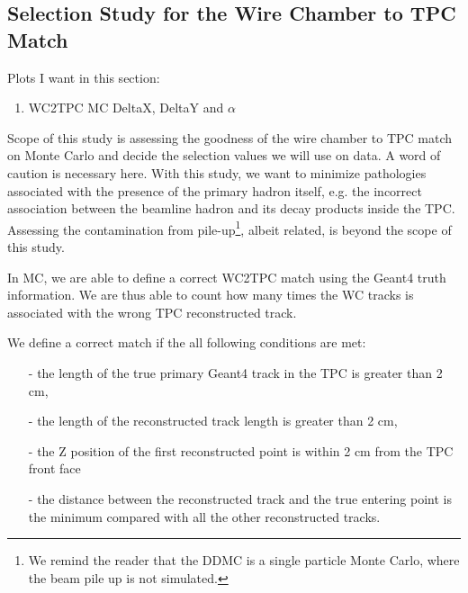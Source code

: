 

\subsection{Selection Study for the Wire Chamber to TPC Match}\label{ch:WC2TPCMatchOptimization}
Plots I want in this section:
\begin{enumerate}
\item WC2TPC MC DeltaX, DeltaY and $\alpha$
\end{enumerate}


Scope of this study is assessing the goodness of the wire chamber to TPC match on Monte Carlo and decide the selection values we will use on data. A word of caution is necessary here. With this study, we want to minimize pathologies associated with the presence of the primary hadron itself, e.g. the incorrect association between the beamline hadron and its decay products inside the TPC.  Assessing the contamination from pile-up\footnote{We remind the reader that the DDMC is a single particle Monte Carlo, where the beam pile up is not simulated.}, albeit related, is beyond the scope of this study.

In MC, we are able to define a correct WC2TPC match using the Geant4 truth information. We are thus able to count how many times the WC tracks is associated with the wrong TPC reconstructed track. 

We define a correct match if the all following conditions are met:
\begin{itemize}
\item[-] the length of the true primary Geant4 track in the TPC is greater than 2 cm,  
\item[-] the length of the reconstructed track length is greater than 2 cm,
\item[-] the Z position of the first reconstructed point is within 2 cm from the TPC front face
\item[-] the distance between the reconstructed track and the true entering point is the minimum compared with all the other reconstructed tracks.
\end{itemize}

